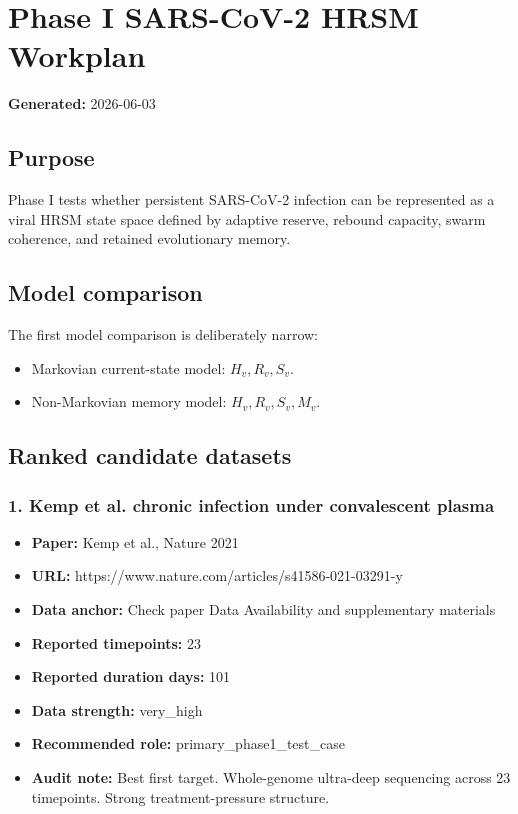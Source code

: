 \section*{Phase I SARS-CoV-2 HRSM Workplan}

\textbf{Generated:} 2026-06-03

\subsection*{Purpose}

Phase I tests whether persistent SARS-CoV-2 infection can be represented as a viral HRSM state space defined by adaptive reserve, rebound capacity, swarm coherence, and retained evolutionary memory.

\subsection*{Model comparison}

The first model comparison is deliberately narrow:

\begin{itemize}
\item Markovian current-state model: \(H_v, R_v, S_v\).
\item Non-Markovian memory model: \(H_v, R_v, S_v, M_v\).
\end{itemize}

\subsection*{Ranked candidate datasets}

\subsubsection*{1. Kemp et al. chronic infection under convalescent plasma}
\begin{itemize}
\item \textbf{Paper:} Kemp et al., Nature 2021
\item \textbf{URL:} https://www.nature.com/articles/s41586-021-03291-y
\item \textbf{Data anchor:} Check paper Data Availability and supplementary materials
\item \textbf{Reported timepoints:} 23
\item \textbf{Reported duration days:} 101
\item \textbf{Data strength:} very\_high
\item \textbf{Recommended role:} primary\_phase1\_test\_case
\item \textbf{Audit note:} Best first target. Whole-genome ultra-deep sequencing across 23 timepoints. Strong treatment-pressure structure.
\end{itemize}

